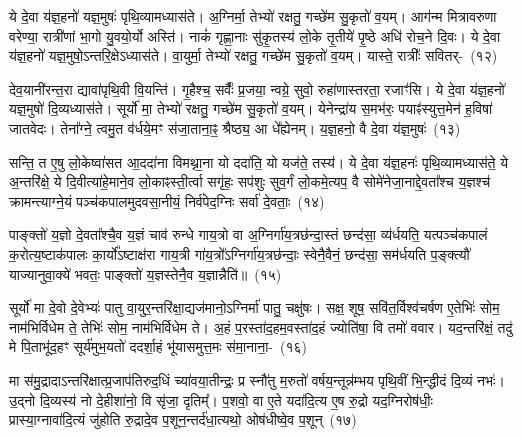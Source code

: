 {}%

ये दे॒वा य॑ज्ञ॒हनो॑ यज्ञ॒मुषः॑ पृथि॒व्यामध्यास॑ते। अ॒ग्निर्मा॒ तेभ्यो॑ रक्षतु॒ गच्छे॑म सु॒कृतो॑ व॒यम्। आग॑न्म मित्रावरुणा वरेण्या॒ रात्री॑णां भा॒गो यु॒वयो॒र्यो अस्ति॑। नाकं॑ गृह्णा॒नाः सु॑कृ॒तस्य॑ लो॒के तृ॒तीये॑ पृ॒ष्ठे अधि॑ रोच॒ने दि॒वः। ये दे॒वा य॑ज्ञ॒हनो॑ यज्ञ॒मुषो॒\-ऽन्तरि॒क्षे\-ऽध्यास॑ते। वा॒युर्मा॒ तेभ्यो॑ रक्षतु॒ गच्छे॑म सु॒कृतो॑ व॒यम्। यास्ते॒ रात्रीः᳚ \mbox{सवितर्-~(१२)}

देव॒यानी॑रन्त॒रा द्यावा॑\-पृथि॒वी वि॒यन्ति॑। गृ॒हैश्च॒ सर्वैः᳚ प्र॒जया॒ न्वग्रे॒ सुवो॒ रुहा॑णास्तरता॒ रजाꣳ॑सि। ये दे॒वा य॑ज्ञ॒हनो॑ यज्ञ॒मुषो॑ दि॒व्यध्यास॑ते। सूर्यो॑ मा॒ तेभ्यो॑ रक्षतु॒ गच्छे॑म सु॒कृतो॑ व॒यम्। येनेन्द्रा॑य स॒मभ॑रः॒ पयाꣴ॑स्युत्त॒\-मेन॑ ह॒विषा॑ जातवेदः। तेना᳚ग्ने॒ त्वमु॒त व॑र्धये॒मꣳ स॑जा॒ताना॒ꣴ॒ श्रैष्ठ्य॒ आ धे᳚ह्येनम्। य॒ज्ञ॒हनो॒ वै दे॒वा य॑ज्ञ॒मुषः॑~(१३)

सन्ति॒ त ए॒षु लो॒केष्वा॑सत आ॒ददा॑ना विमथ्ना॒ना यो ददा॑ति॒ यो यज॑ते॒ तस्य॑। ये दे॒वा य॑ज्ञ॒हनः॑ पृथि॒व्यामध्यास॑ते॒ ये अ॒न्तरि॑क्षे॒ ये दि॒वीत्या॑हे॒माने॒व लो॒काꣴस्ती॒र्त्वा सगृ॑हः॒ सप॑शुः सुव॒र्गं लो॒कमे॒त्यप॒ वै सोमे॑नेजा॒नाद्दे॒वता᳚श्च य॒ज्ञश्च॑ क्रामन्त्याग्ने॒यं पञ्च॑कपालमुदवसा॒नीयं॒ निर्व॑पेद॒ग्निः सर्वा॑ दे॒वताः॒~(१४)

पाङ्क्तो॑ य॒ज्ञो दे॒वता᳚श्चै॒व य॒ज्ञं चाव॑ रुन्धे गाय॒त्रो वा अ॒ग्निर्गा॑य॒त्रछ॑न्दा॒स्तं छन्द॑सा॒ व्य॑र्धयति॒ यत्पञ्च॑कपालं क॒रोत्य॒ष्टाक॑पालः का॒र्यो᳚\-ऽष्टाक्ष॑रा गाय॒त्री गा॑य॒त्रो᳚\-ऽग्निर्गा॑य॒त्रछ॑न्दाः॒ स्वेनै॒वैनं॒ छन्द॑सा॒ सम॑र्धयति प॒ङ्क्त्यौ॑ याज्यानुवा॒क्ये॑ भवतः॒ पाङ्क्तो॑ य॒ज्ञस्तेनै॒व य॒ज्ञान्नैति॑॥~(१५)

{\anuvakamend[{स॒वि॒त॒र्दे॒वा य॑ज्ञ॒मुषः॒ सर्वा॑ दे॒वता॒स्त्रिच॑त्वारिꣳशच्च}]}%

सूर्यो॑ मा दे॒वो दे॒वेभ्यः॑ पातु वा॒युर॒न्तरि॑क्षा॒द्यज॑मानो॒\-ऽग्निर्मा॑ पातु॒ चक्षु॑षः। सक्ष॒ शूष॒ सवि॑त॒र्विश्व॑चर्\mbox{}षण ए॒तेभिः॑ सोम॒ नाम॑भिर्विधेम ते॒ तेभिः॑ सोम॒ नाम॑भिर्विधेम ते। अ॒हं प॒रस्ता॑द॒हम॒वस्ता॑द॒हं ज्योति॑षा॒ वि तमो॑ ववार। यद॒न्तरि॑क्षं॒ तदु॑ मे पि॒ताभू॑द॒हꣳ सूर्य॑मुभ॒यतो॑ ददर्\mbox{}शा॒हं भू॑यासमुत्त॒मः स॑मा॒नाना॒-~(१६)

मा स॑मु॒द्रादा\-ऽन्तरि॑क्षात्प्र॒जा\-प॑तिरुद॒धिं च्या॑वया॒तीन्द्रः॒ प्र स्नौ॑तु म॒रुतो॑ वर्\mbox{}षय॒न्तून्न॑म्भय पृथि॒वीं भि॒न्द्धीदं दि॒व्यं नभः॑। उ॒द्नो दि॒व्यस्य॑ नो दे॒हीशा॑नो॒ वि सृ॑जा॒ दृतिम्᳚। प॒शवो॒ वा ए॒ते यदा॑दि॒त्य ए॒ष रु॒द्रो यद॒ग्निरोष॑धीः॒ प्रास्या॒ग्नावा॑दि॒त्यं जु॑होति रु॒द्रादे॒व प॒शून॒न्तर्द॑धा॒त्यथो॒ ओष॑धीष्वे॒व प॒शून्~(१७)

